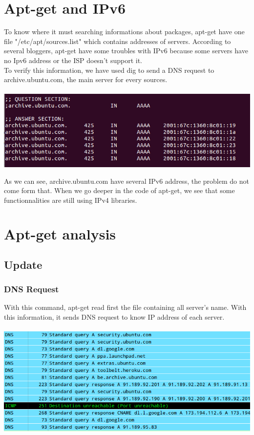 \documentclass[twoside]{article}
\begin{document}
\begin{multicols}{2}
\section{Apt-get and IPv6}
To know where it must searching informations about packages, apt-get have one file "/etc/apt/sources.list" which contains addresses of servers.  According to several bloggers, apt-get have some troubles with IPv6 because some servers have no Ipv6 address or the ISP doesn't support it.\\
To verify this information, we have used dig to send a DNS request to archive.ubuntu.com, the main server for every sources.\\ \\\includegraphics[scale=0.3]{pictures/DNS_info.png}



As we can see, archive.ubuntu.com have several IPv6 address, the problem do not come form that.  When we go deeper in the code of apt-get, we see that some functionnalities are still using IPv4 libraries.

\section{Apt-get analysis}
\subsection{Update}
\subsubsection{DNS Request}
With this command, apt-get read first the file containing all server's name.  With this information, it sends DNS request to know IP address of each server. \\ \\ \includegraphics[scale=0.32]{pictures/dns_update.png}


\end{multicols}
\end{document}
